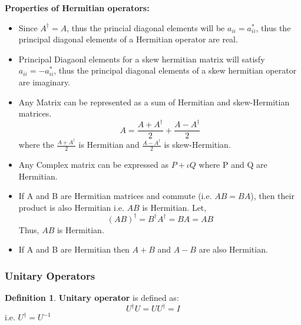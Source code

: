 \documentclass[12pt, oneside]{book}
\theoremstyle{definition}
\newtheorem{definition}{Definition}[section]
\theoremstyle{definition}
\theoremstyle{remark}
\begin{document}
\textbf{Properties of Hermitian operators: }
\begin{itemize}
    \item Since $A^{\dagger}=A$, thus the princial diagonal elements will be $a_{ii}=a_{ii}^*$, thus the principal diagonal elements of a Hermitian operator are real.
    \item Principal Diagaonl elements for a skew hermitian matrix will satisfy $a_{ii}=-a_{ii}^*$, thus the principal diagonal elements of a skew hermitian operator are imaginary.
    \item Any Matrix can be represented as a sum of Hermitian and skew-Hermitian matrices.
    \[ A = \frac{A+A^{\dagger}}{2} + \frac{A-A^{\dagger}}{2} \] 
    where the $\frac{A + A^{\dagger}}{2}$ is Hermitian and $\frac{A-A^{\dagger}}{2}$ is skew-Hermitian.
    \item Any Complex matrix can be expressed as $P+ \iota Q$ where P and Q are Hermitian.
    \item If A and B are Hermitian matrices and commute (i.e. $AB=BA$), then their product is also Hermitian i.e. $AB$ is Hermitian.
    Let,
    \[ (AB)^{\dagger}=B^{\dagger}A^{\dagger}=BA=AB \]
    Thus, $AB$ is Hermitian.
    \item If A and B are Hermitian then $A+B$ and $A-B$ are also Hermitian.
\end{itemize}

\subsubsection{Unitary Operators}
\begin{definition}
\textbf{Unitary operator} is defined as:
\[U^{\dagger}U=UU^{\dagger}=I\]
i.e. $U^{\dagger}=U^{-1}$\\
\end{definition}
\end{document}

